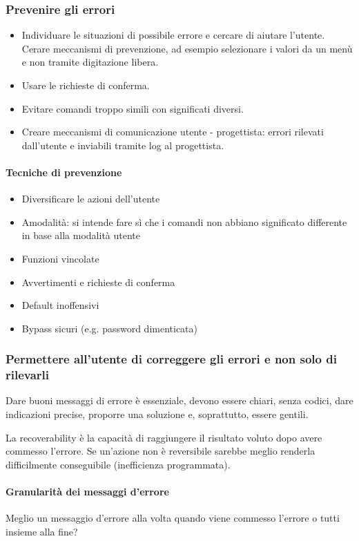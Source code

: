 \documentclass[11pt,a4paper]{book}
\begin{document}
\subsubsection{Prevenire gli errori}
\begin{itemize}
	\item Individuare le situazioni di possibile errore e cercare di aiutare l'utente. Cerare meccanismi di prevenzione, ad esempio selezionare i valori da un menù e non tramite digitazione libera.
	\item Usare le richieste di conferma.
	\item Evitare comandi troppo simili con significati diversi.
	\item Creare meccanismi di comunicazione utente - progettista: errori rilevati dall'utente e inviabili tramite log al progettista.
\end{itemize}

\paragraph{Tecniche di prevenzione}
\begin{itemize}
	\item Diversificare le azioni dell'utente
	\item Amodalità: si intende fare sì che i comandi non abbiano significato differente in base alla modalità utente
	\item Funzioni vincolate
	\item Avvertimenti e richieste di conferma
	\item Default inoffensivi
	\item Bypass sicuri (e.g. password dimenticata)
\end{itemize}

\subsubsection{Permettere all'utente di correggere gli errori e non solo di rilevarli}
Dare buoni messaggi di errore è essenziale, devono essere chiari, senza codici, dare indicazioni precise, proporre una soluzione e, soprattutto, essere gentili.

La recoverability è la capacità di raggiungere il risultato voluto dopo avere commesso l'errore. Se un'azione non è reversibile sarebbe meglio renderla difficilmente conseguibile (inefficienza programmata).

\paragraph{Granularità dei messaggi d'errore}
Meglio un messaggio d'errore alla volta quando viene commesso l'errore o tutti insieme alla fine?
\end{document}
